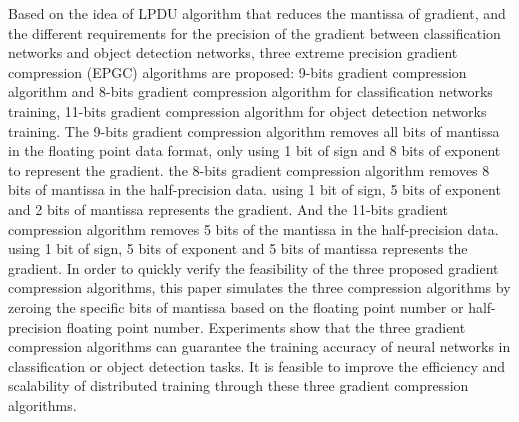 \begin{eabstract}
Based on the idea of LPDU algorithm that reduces the mantissa of gradient, and the different requirements for the precision of the gradient between classification networks and object detection networks, three extreme precision gradient compression (EPGC) algorithms are proposed: 9-bits gradient compression algorithm and 8-bits gradient compression algorithm for classification networks training, 11-bits gradient compression algorithm for object detection networks training. The 9-bits gradient compression algorithm removes all bits of mantissa in the floating point data format, only using 1 bit of sign and 8 bits of exponent to represent the gradient. the 8-bits gradient compression algorithm removes 8 bits of mantissa in the half-precision data. using 1 bit of sign, 5 bits of exponent and 2 bits of mantissa represents the gradient. And the 11-bits gradient compression algorithm removes 5 bits of the mantissa in the half-precision data. using 1 bit of sign, 5 bits of exponent and 5 bits of mantissa represents the gradient. In order to quickly verify the feasibility of the three proposed gradient compression algorithms, this paper simulates the three compression algorithms by zeroing the specific bits of mantissa based on the floating point number or half-precision floating point number. Experiments show that the three gradient compression algorithms can guarantee the training accuracy of neural networks in classification or object detection tasks. It is feasible to improve the efficiency and scalability of distributed training through these three gradient compression algorithms.

\end{eabstract}

